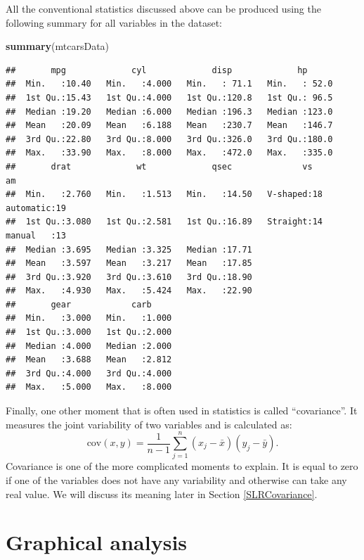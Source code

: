 \documentclass[
]{book}
\newenvironment{Shaded}{\begin{snugshade}}{\end{snugshade}}
\newcommand{\FunctionTok}[1]{\textcolor[rgb]{0.13,0.29,0.53}{\textbf{#1}}}
\newcommand{\NormalTok}[1]{#1}
\theoremstyle{definition}
\theoremstyle{definition}
\theoremstyle{definition}
\theoremstyle{definition}
\theoremstyle{remark}
\begin{document}
All the conventional statistics discussed above can be produced using the following summary for all variables in the dataset:

\begin{Shaded}
\begin{Highlighting}[]
\FunctionTok{summary}\NormalTok{(mtcarsData)}
\end{Highlighting}
\end{Shaded}

\begin{verbatim}
##       mpg             cyl             disp             hp       
##  Min.   :10.40   Min.   :4.000   Min.   : 71.1   Min.   : 52.0  
##  1st Qu.:15.43   1st Qu.:4.000   1st Qu.:120.8   1st Qu.: 96.5  
##  Median :19.20   Median :6.000   Median :196.3   Median :123.0  
##  Mean   :20.09   Mean   :6.188   Mean   :230.7   Mean   :146.7  
##  3rd Qu.:22.80   3rd Qu.:8.000   3rd Qu.:326.0   3rd Qu.:180.0  
##  Max.   :33.90   Max.   :8.000   Max.   :472.0   Max.   :335.0  
##       drat             wt             qsec              vs             am    
##  Min.   :2.760   Min.   :1.513   Min.   :14.50   V-shaped:18   automatic:19  
##  1st Qu.:3.080   1st Qu.:2.581   1st Qu.:16.89   Straight:14   manual   :13  
##  Median :3.695   Median :3.325   Median :17.71                               
##  Mean   :3.597   Mean   :3.217   Mean   :17.85                               
##  3rd Qu.:3.920   3rd Qu.:3.610   3rd Qu.:18.90                               
##  Max.   :4.930   Max.   :5.424   Max.   :22.90                               
##       gear            carb      
##  Min.   :3.000   Min.   :1.000  
##  1st Qu.:3.000   1st Qu.:2.000  
##  Median :4.000   Median :2.000  
##  Mean   :3.688   Mean   :2.812  
##  3rd Qu.:4.000   3rd Qu.:4.000  
##  Max.   :5.000   Max.   :8.000
\end{verbatim}

Finally, one other moment that is often used in statistics is called ``covariance''. It measures the joint variability of two variables and is calculated as:
\begin{equation}
    \mathrm{cov}(x,y)= \frac{1}{n-1}\sum_{j=1}^n (x_j - \bar{x}) (y_j - \bar{y}) .
    \label{eq:Covariance}
\end{equation}
Covariance is one of the more complicated moments to explain. It is equal to zero if one of the variables does not have any variability and otherwise can take any real value. We will discuss its meaning later in Section \ref{SLRCovariance}.

\section{Graphical analysis}\label{dataAnalysisGraphical}
\end{document}

